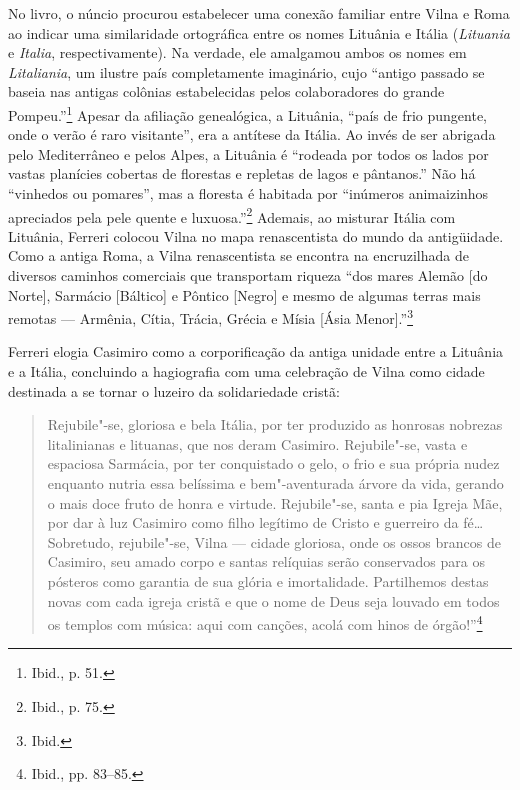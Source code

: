 No livro, o núncio procurou estabelecer uma conexão familiar entre Vilna
e Roma ao indicar uma similaridade ortográfica entre os nomes Lituânia e
Itália (\emph{Lituania} e \emph{Italia}, respectivamente). Na verdade,
ele amalgamou ambos os nomes em \emph{Litaliania}, um ilustre país
completamente imaginário, cujo ``antigo passado se baseia nas antigas
colônias estabelecidas pelos colaboradores do grande Pompeu.''\footnote{Ibid.,
  p. 51.} Apesar da afiliação genealógica, a Lituânia, ``país de frio
pungente, onde o verão é raro visitante'', era a antítese da Itália. Ao
invés de ser abrigada pelo Mediterrâneo e pelos Alpes, a Lituânia é
``rodeada por todos os lados por vastas planícies cobertas de florestas
e repletas de lagos e pântanos.'' Não há ``vinhedos ou pomares'', mas a
floresta é habitada por ``inúmeros animaizinhos apreciados pela pele
quente e luxuosa.''\footnote{Ibid., p. 75.} Ademais, ao misturar Itália
com Lituânia, Ferreri colocou Vilna no mapa renascentista do mundo da
antigüidade. Como a antiga Roma, a Vilna renascentista se encontra na
encruzilhada de diversos caminhos comerciais que transportam riqueza
``dos mares Alemão {[}do Norte{]}, Sarmácio {[}Báltico{]} e Pôntico
{[}Negro{]} e mesmo de algumas terras mais remotas --- Armênia, Cítia,
Trácia, Grécia e Mísia {[}Ásia Menor{]}.''\footnote{Ibid.}

Ferreri elogia Casimiro como a corporificação da antiga unidade entre a
Lituânia e a Itália, concluindo a hagiografia com uma celebração de
Vilna como cidade destinada a se tornar o luzeiro da solidariedade
cristã:

\begin{quote}
Rejubile"-se, gloriosa e bela Itália, por ter produzido as honrosas
nobrezas litalinianas e lituanas, que nos deram Casimiro. Rejubile"-se,
vasta e espaciosa Sarmácia, por ter conquistado o gelo, o frio e sua
própria nudez enquanto nutria essa belíssima e bem"-aventurada árvore da
vida, gerando o mais doce fruto de honra e virtude. Rejubile"-se, santa e
pia Igreja Mãe, por dar à luz Casimiro como filho legítimo de Cristo e
guerreiro da fé\ldots{} Sobretudo, rejubile"-se, Vilna --- cidade gloriosa,
onde os ossos brancos de Casimiro, seu amado corpo e santas relíquias
serão conservados para os pósteros como garantia de sua glória e
imortalidade. Partilhemos destas novas com cada igreja cristã e que o
nome de Deus seja louvado em todos os templos com música: aqui com
canções, acolá com hinos de órgão!''\footnote{Ibid., pp. 83--85.}
\end{quote}

